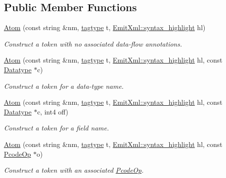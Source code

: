 \subsection*{Public Member Functions}
\begin{DoxyCompactItemize}
\item 
\mbox{\hyperlink{struct_print_language_1_1_atom_a23a38bc6f97afc98090701ac762acd59}{Atom}} (const string \&nm, \mbox{\hyperlink{class_print_language_a7102f70f47777d8b17af52c5157c473e}{tagtype}} t, \mbox{\hyperlink{class_emit_xml_a7c3577436da429c3c75f4b82cac6864f}{Emit\+Xml\+::syntax\+\_\+highlight}} hl)
\begin{DoxyCompactList}\small\item\em Construct a token with no associated data-\/flow annotations. \end{DoxyCompactList}\item 
\mbox{\hyperlink{struct_print_language_1_1_atom_acc7729810a5204cedb14d7d528e2d16a}{Atom}} (const string \&nm, \mbox{\hyperlink{class_print_language_a7102f70f47777d8b17af52c5157c473e}{tagtype}} t, \mbox{\hyperlink{class_emit_xml_a7c3577436da429c3c75f4b82cac6864f}{Emit\+Xml\+::syntax\+\_\+highlight}} hl, const \mbox{\hyperlink{class_datatype}{Datatype}} $\ast$c)
\begin{DoxyCompactList}\small\item\em Construct a token for a data-\/type name. \end{DoxyCompactList}\item 
\mbox{\hyperlink{struct_print_language_1_1_atom_aac8870447a41bff5f9129e27fc475258}{Atom}} (const string \&nm, \mbox{\hyperlink{class_print_language_a7102f70f47777d8b17af52c5157c473e}{tagtype}} t, \mbox{\hyperlink{class_emit_xml_a7c3577436da429c3c75f4b82cac6864f}{Emit\+Xml\+::syntax\+\_\+highlight}} hl, const \mbox{\hyperlink{class_datatype}{Datatype}} $\ast$c, int4 off)
\begin{DoxyCompactList}\small\item\em Construct a token for a field name. \end{DoxyCompactList}\item 
\mbox{\hyperlink{struct_print_language_1_1_atom_a723f5f1e5dc9af9d9b5c8608cd9e8f79}{Atom}} (const string \&nm, \mbox{\hyperlink{class_print_language_a7102f70f47777d8b17af52c5157c473e}{tagtype}} t, \mbox{\hyperlink{class_emit_xml_a7c3577436da429c3c75f4b82cac6864f}{Emit\+Xml\+::syntax\+\_\+highlight}} hl, const \mbox{\hyperlink{class_pcode_op}{Pcode\+Op}} $\ast$o)
\begin{DoxyCompactList}\small\item\em Construct a token with an associated \mbox{\hyperlink{class_pcode_op}{Pcode\+Op}}. \end{DoxyCompactList}\item 

\end{DoxyCompactItemize}
